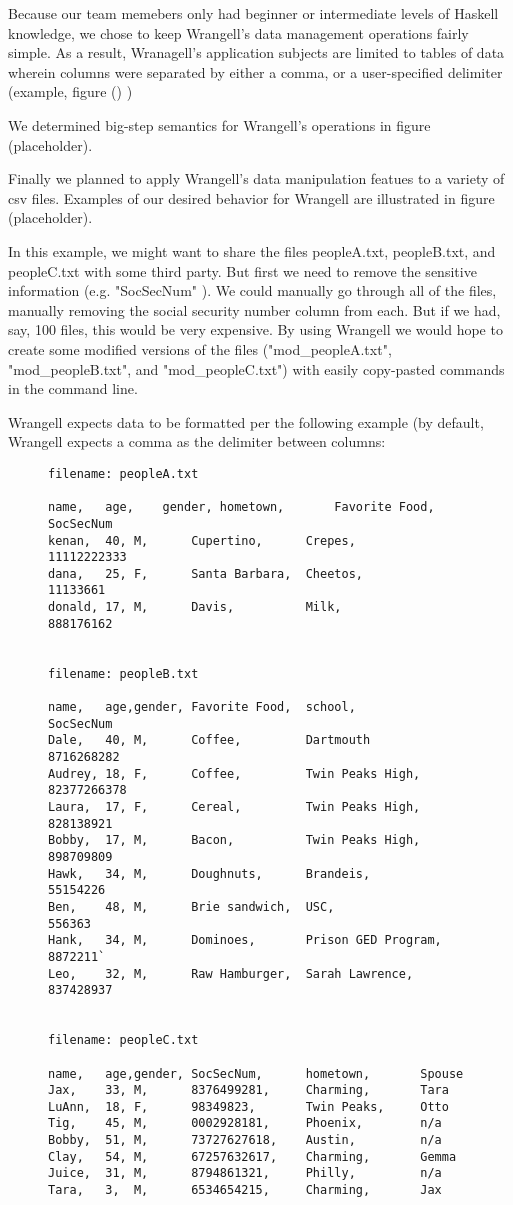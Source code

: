 \documentclass[preprint,nocopyrightspace]{sig-alternate}
\begin{document}
Because our team memebers only had beginner or intermediate levels of Haskell knowledge, we chose to keep Wrangell's data management operations fairly simple. 
As a result, Wranagell's application subjects are limited to tables of data wherein columns were separated by either a comma, or a user-specified delimiter (example, figure () )

We determined big-step semantics for Wrangell's operations in figure (placeholder).


Finally we planned to apply Wrangell's data manipulation featues to a variety of csv files. Examples of our desired behavior for Wrangell are illustrated in figure (placeholder). 



In this example, we might want to share the files peopleA.txt, peopleB.txt, and peopleC.txt with some third party. But first we need to remove the sensitive information (e.g. "SocSecNum" ). We could manually go through all of the files, manually removing the social security number column from each. But if we had, say, 100 files, this would be very expensive. By using Wrangell we would hope to create some modified versions of the files ("mod\_peopleA.txt", "mod\_peopleB.txt", and "mod\_peopleC.txt") with easily copy-pasted commands in the command line.


Wrangell expects data to be formatted per the following example (by default, Wrangell expects a comma as the delimiter between columns: 
\begin{figure}
\begin{verbatim}
filename: peopleA.txt

name,	age,	gender,	hometown,		Favorite Food,	SocSecNum
kenan,	40,	M,		Cupertino,		Crepes,			11112222333
dana,	25,	F,		Santa Barbara,	Cheetos,		11133661
donald,	17,	M,		Davis,			Milk,			888176162


filename: peopleB.txt

name,	age,gender,	Favorite Food,	school,				SocSecNum
Dale,	40,	M,		Coffee,			Dartmouth			8716268282
Audrey,	18,	F,		Coffee,			Twin Peaks High,	82377266378
Laura,	17,	F,		Cereal,			Twin Peaks High,	828138921
Bobby,	17,	M,		Bacon,			Twin Peaks High,	898709809
Hawk,	34,	M,		Doughnuts,		Brandeis,			55154226
Ben,	48,	M,		Brie sandwich,	USC,				556363
Hank,	34,	M,		Dominoes,		Prison GED Program,	8872211`
Leo,	32,	M,		Raw Hamburger,	Sarah Lawrence,		837428937


filename: peopleC.txt

name,	age,gender,	SocSecNum,		hometown,		Spouse
Jax,	33,	M,		8376499281,		Charming,		Tara
LuAnn,	18,	F,		98349823,		Twin Peaks,		Otto
Tig,	45,	M,		0002928181,		Phoenix,		n/a
Bobby,	51,	M,		73727627618,	Austin,			n/a
Clay,	54,	M,		67257632617,	Charming,		Gemma
Juice,	31,	M,		8794861321,		Philly,			n/a
Tara,	3,	M,		6534654215,		Charming,		Jax

\end{verbatim}
\end{figure}
\end{document}
